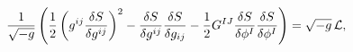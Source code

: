 \begin{equation}
\frac{1}{\sqrt{-g}}\left( \frac{1}{2} \left(g^{ij}
{\frac{\delta S}{\delta g^{ij}}}\right)^2
-{\frac{\delta S}{\delta g^{ij}}}{\frac{\delta S}{\delta g_{ij}}}
-\frac{1}{2} G^{IJ}
\frac{\delta S}{\delta \phi^{I}} \frac{\delta S}{\delta \phi^{I}}\right)
= \sqrt{-g}\, {\cal{L}},
\end{equation}

